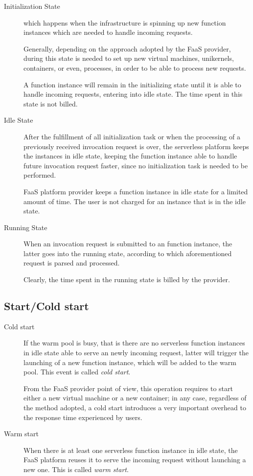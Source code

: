 \documentclass[10pt,a4paper]{report}
\theoremstyle{definition}
\begin{document}
\begin{description}
	
	\item[Initialization State] which happens when the infrastructure is spinning up new function instances which are needed to handle incoming requests. 
	
	Generally, depending on the approach adopted by the FaaS provider, during this state is needed to set up new virtual machines, unikernels, containers, or even, processes, in order to be able to process new requests.
	
	A function instance will remain in the initializing state until it is able to handle incoming requests, entering into idle state. The time spent in this state is not billed. 
	
	\item[Idle State] After the fulfillment of all initialization task or when the processing of a previously received invocation request is over, the serverless platform keeps the instances in idle state, keeping the function instance able to handle future invocation request faster, since no initialization task is needed to be performed.
	
	FaaS platform provider keeps a function instance in idle state for a limited amount of time. The user is not charged for an instance that is in the idle state.
	
	\item[Running State] When an invocation request is submitted to an function instance, the latter goes into the running state, according to which aforementioned request is parsed and processed.
	
	Clearly, the time spent in the running state is billed by the provider.
		
\end{description}

\subsection{Start/Cold start}

\begin{description}
	\item[Cold start] If the warm pool is busy, that is there are no serverless function instances in idle state able to serve an newly incoming request, latter will trigger the launching of a new function instance, which will be added to the warm pool. This event is called \textit{cold start}.
	
	From the FaaS provider point of view, this operation requires to start either a new virtual	machine or a new container; in any case, regardless of the method adopted, a cold start introduces a very important overhead to the response time experienced by users. 
	
	\item[Warm start] When there is at least one serverless function instance in idle state, the FaaS platform reuses it to serve the incoming request without launching a new one. This is called \textit{warm start}.
\end{description}  
\end{document}
